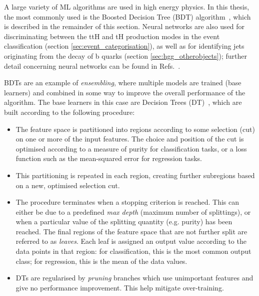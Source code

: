 A large variety of ML algorithms are used in high energy physics. In this thesis, the most commonly used is the Boosted Decision Tree (BDT) algorithm~\cite{Yang_2005}, which is described in the remainder of this section. Neural networks are also used for discriminating between the ttH and tH production modes in the \Hgg event classification (section \ref{sec:event_categorisation}), as well as for identifying jets originating from the decay of b quarks (section \ref{sec:hgg_otherobjects}); further detail concerning neural networks can be found in Refs.~\cite{hastie01statisticallearning,10.5555/3086952,bishop:2006:PRML}.

BDTs are an example of \textit{ensembling}, where multiple models are trained (base learners) and combined in some way to improve the overall performance of the algorithm. The base learners in this case are Decision Trees (DT)~\cite{Quinlan86inductionof}, which are built according to the following procedure:

\begin{itemize}
    \item The feature space is partitioned into regions according to some selection (cut) on one or more of the input features. The choice and position of the cut is optimised according to a measure of purity for classification tasks, or a loss function such as the mean-squared error for regression tasks.
    
    \item This partitioning is repeated in each region, creating further subregions based on a new, optimised selection cut.
    
    \item The procedure terminates when a stopping criterion is reached. This can either be due to a predefined \textit{max depth} (maximum number of splittings), or when a particular value of the splitting quantity (e.g. purity) has been reached. The final regions of the feature space that are not further split are referred to as \textit{leaves}. Each leaf is assigned an output value according to the data points in that region: for classification, this is the most common output class; for regression, this is the mean of the data values.
    
    \item DTs are regularised by \textit{pruning} branches which use unimportant features and give no performance improvement. This help mitigate over-training.
\end{itemize}

